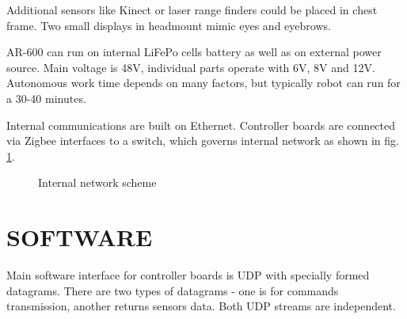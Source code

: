 \documentclass[letterpaper, 10 pt, conference]{ieeeconf}  %
\begin{document}
Additional sensors like Kinect or laser range finders could be placed in chest
frame. Two small displays in headmount mimic eyes and eyebrows.

AR-600 can run on internal LiFePo cells battery as well as on external power
source. Main voltage is 48V, individual parts operate with 6V, 8V and 12V.
Autonomous work time depends on many factors, but typically robot can run for a
30-40 minutes.

Internal communications are built on Ethernet. Controller boards are connected
via Zigbee interfaces to a switch, which governs internal network as shown
in fig. \ref{img:network}.

\begin{figure}[thpb]
\centering
{}
\caption{Internal network scheme}
\label{img:network}
\end{figure}  

\section{SOFTWARE}

Main software interface for controller boards is UDP with specially formed
datagrams. There are two types of datagrams - one is for commands transmission,
another returns sensors data. Both UDP streams are independent.
\end{document}
